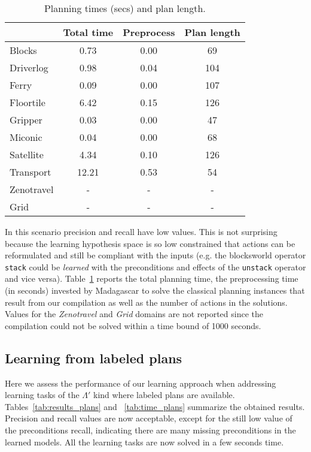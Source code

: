 \documentclass[letterpaper]{article} %
\begin{document}
\begin{table}
\begin{footnotesize}
	\begin{center}
		\begin{tabular}{l|c|c|c|}			
			 & Total time & Preprocess & Plan length  \\
			\hline
            Blocks & 0.73 & 0.00 & 69  \\
            Driverlog & 0.98 & 0.04 & 104 \\
            Ferry & 0.09 & 0.00 & 107 \\
            Floortile & 6.42 & 0.15 & 126 \\
            Gripper & 0.03 & 0.00 & 47 \\
            Miconic & 0.04 & 0.00 & 68 \\
            Satellite & 4.34 & 0.10 & 126 \\
            Transport & 12.21 & 0.53 & 54 \\			
            Zenotravel & - & - & - \\
            Grid & - & - & - \\
		\end{tabular}
	\end{center}
        \end{footnotesize}
	\caption{\small Planning times (secs) and plan length.}
	\label{tab:time_states}	
\end{table}


In this scenario precision and recall have low values. This is not surprising because the learning hypothesis space is so low constrained that actions can be reformulated and still be compliant with the inputs (e.g. the blocksworld operator {\small\tt stack} could be {\em learned} with the preconditions and effects of the {\small\tt unstack} operator and vice versa). Table~\ref{tab:time_states} reports the total planning time, the preprocessing time (in seconds) invested by {\sc Madagascar} to solve the classical planning instances that result from our compilation as well as the number of actions in the solutions. Values for the {\em Zenotravel} and {\em Grid} domains are not reported since the compilation could not be solved within a time bound of 1000 seconds.


\subsection{Learning from labeled plans}
Here we assess the performance of our learning approach when addressing learning tasks of the $\Lambda'$ kind where labeled plans are available. Tables~\ref{tab:results_plans} and ~\ref{tab:time_plans} summarize the obtained results. Precision and recall values are now acceptable, except for the still low value of the preconditions recall, indicating there are many missing preconditions in the learned models. All the learning tasks are now solved in a few seconds time.	
\end{document}
